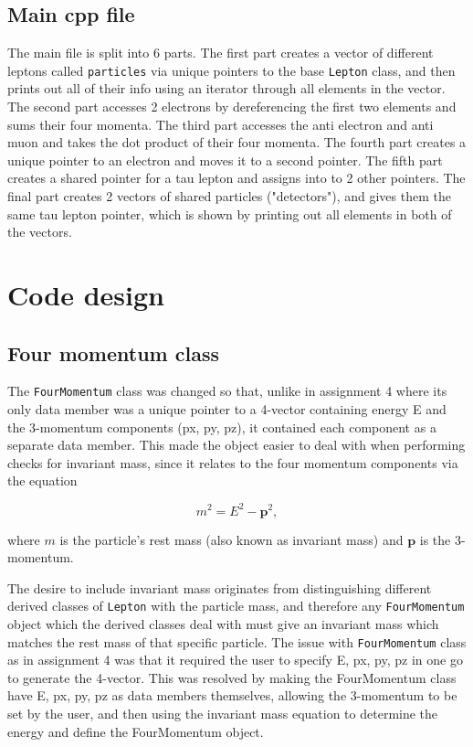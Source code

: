 \documentclass[11pt, letterpaper]{article}
\begin{document}
\subsection{Main cpp file}
The main file is split into 6 parts. The first part creates a vector of different leptons called \verb|particles| via unique pointers to the base \verb|Lepton| class, and then prints out all of their info using an iterator through all elements in the vector. The second part accesses 2 electrons by dereferencing the first two elements and sums their four momenta. The third part accesses the anti electron and anti muon and takes the dot product of  their four momenta. The fourth part creates a unique pointer to an electron and moves it to a second pointer. The fifth part creates a shared pointer for a tau lepton and assigns into to 2 other pointers. The final part creates 2 vectors of shared particles ("detectors"), and gives them the same tau lepton pointer, which is shown by printing out all elements in both of the vectors.

\newpage
\section{Code design}
\subsection{Four momentum class}
The \verb|FourMomentum| class was changed so that, unlike in assignment 4 where its only data member was a unique pointer to a 4-vector containing energy E and the 3-momentum components (px, py, pz), it contained each component as a separate data member. This made the object easier to deal with when performing checks for invariant mass, since it relates to the four momentum components via the equation

\begin{equation} \label{eq:fm}
	m^2  = E^2 - \mathbf{p}^2,
 \end{equation}

where $m$ is the particle's rest mass (also known as invariant mass) and $\mathbf{p}$ is the 3-momentum. 

The desire to include invariant mass originates from distinguishing different derived classes of \verb|Lepton| with the particle mass, and therefore any \verb|FourMomentum| object which the derived classes deal with must give an invariant mass which matches the rest mass of that specific particle. The issue with \verb|FourMomentum| class as in assignment 4 was that it required the user to specify E, px, py, pz in one go to generate the 4-vector. This was resolved by making the FourMomentum class have E, px, py, pz as data members themselves, allowing the 3-momentum to be set by the user, and then using the invariant mass equation to determine the energy and define the FourMomentum object.
\end{document}
